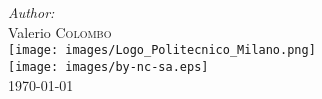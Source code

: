 \documentclass[12pt]{article}
\begin{document}
\begin{titlepage}
    \Large \emph{Author:}\\
    Valerio \textsc{Colombo}\\[3cm] %


    \texttt{[image: images/Logo\_Politecnico\_Milano.png]}\\[2cm] %


    \texttt{[image: images/by-nc-sa.eps]}\\[1cm]


    {\large \today}\\[2cm] %


    \newpage

\end{titlepage}

\tableofcontents

\newpage










\end{document}
